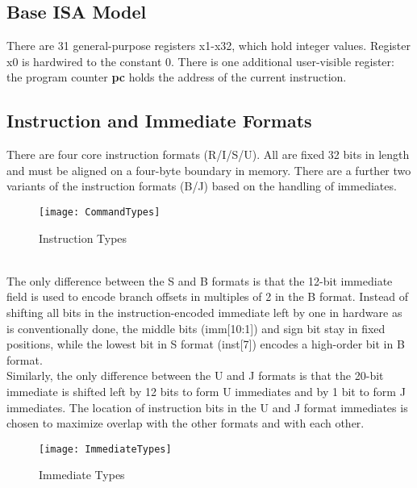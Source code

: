 	\subsection{Base ISA Model}
	\label{subsec:ISA Model}
	There are 31 general-purpose registers x1-x32, which hold integer values. Register x0 is hardwired to the constant 0. There is one additional user-visible register: the program counter \textbf{pc} holds the address of the current instruction.
	\subsection{Instruction and Immediate Formats} \label{sect2.3.3}
	There are four core instruction formats (R/I/S/U). All are fixed 32 bits in length and must be        aligned on a four-byte boundary in memory. There are a further two variants of the instruction formats (B/J) based on the handling of immediates.\\
	\begin{figure}[h!]
		
		\begin{center}
			\texttt{[image: CommandTypes]}
			\caption{Instruction Types}
			\label{Image2.2}
		\end{center}
	\end{figure}
	\\

	The only difference between the S and B formats is that the 12-bit immediate field is used to encode branch offsets in multiples of 2 in the B format. Instead of shifting all bits in the instruction-encoded immediate left by one in hardware as is conventionally done, the middle bits (imm[10:1]) and sign bit stay in fixed positions, while the lowest bit in S format (inst[7]) encodes a high-order bit in B format.
	\\
	
	Similarly, the only difference between the U and J formats is that the 20-bit immediate is shifted left by 12 bits to form U immediates and by 1 bit to form J immediates. The location of instruction bits in the U and J format immediates is chosen to maximize overlap with the other formats and with each other.\\
	
	\begin{figure}[h!]
		
		\begin{center}
			\texttt{[image: ImmediateTypes]}
			\caption{Immediate Types}
			\label{Image2.3}
		\end{center}
	\end{figure}

